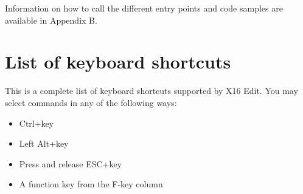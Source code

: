 \documentclass{article}
\begin{document}
        Information on how to call the different entry points and code samples are available in Appendix B. 

\appendix
\newpage
\section{List of keyboard shortcuts}
    This is a complete list of keyboard shortcuts supported
    by X16 Edit. You may select commands in any of the following ways:

    \begin{itemize}
        \item Ctrl+key
        \item Left Alt+key
        \item Press and release ESC+key
        \item A function key from the F-key column
    \end{itemize}
\end{document}
